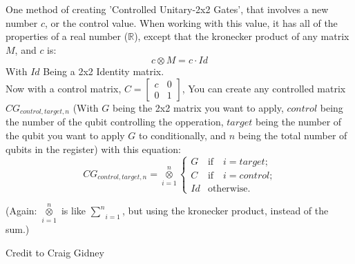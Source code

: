 \documentclass[../main.tex]{subfiles}
\begin{document}
One method of creating 'Controlled Unitary-2x2 Gates',
that involves a new number \(c\), or the control value. 
When working with this value, it has all of the properties of a real number (\(\mathbb{R}\)), except that the kronecker product of any matrix \(M\), and \(c\) is:
\begin{equation}
	c \otimes M = c \cdot Id
\end{equation}
With \(Id\) Being a 2x2 Identity matrix. \\
Now with a control matrix, \(C = \begin{bmatrix} c & 0 \\ 0 & 1\end{bmatrix}\), You can create any controlled matrix \(CG_{control, target, n}\) (With \(G\) being the 2x2 matrix you want to apply, \(control\) being the number of the qubit controlling the opperation, \(target\) being the number of the qubit you want to apply \(G\) to conditionally, and \(n\) being the total number of qubits in the register) with this equation:
\begin{equation}
	CG_{control, target, n} = \underset{i=1}{\overset{n}{\otimes}}
	\begin{cases}
    	G & \text{if} \quad i = target\text{;} \\
    	C & \text{if} \quad i = control\text{;} \\
    	Id & \text{otherwise.} 
	\end{cases}
\end{equation}

(Again: \(\underset{i=1}{\overset{n}{\otimes}}\) is like \(\underset{i=1}{\overset{n}{\sum}}\), but using the kronecker product, instead of the sum.)

Credit to Craig Gidney \cite{controlslikevalues}
\end{document}
